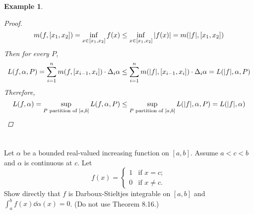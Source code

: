 \documentclass[]{article}
\newtheorem{example}{Example}
\begin{document}
\begin{example}
\begin{enumerate}
\begin{proof}
\[                m(f, [x_1, x_2]) 
                    = \inf_{x \in [x_1, x_2]} f(x) 
                    \leq \inf_{x \in [x_1, x_2]} \abs{f(x)} 
                = m(\abs{f}, [x_1, x_2])
            \] Then for every $P$, \[
                L(f, \alpha, P) 
                    = \sum_{i=1}^{n} m(f, [x_{i-1}, x_i]) \cdot \Delta_i \alpha 
                    \leq \sum_{i=1}^{n} m(\abs{f}, [x_{i-1}, x_i]) \cdot \Delta_i \alpha 
                = L(\abs{f}, \alpha, P)
            \] Therefore, \[
                L(f, \alpha) 
                    = \sup_{P \text{ partition of } [a,b]} L(f, \alpha, P)
                    \leq \sup_{P \text{ partition of } [a,b]} L(\abs{f}, \alpha, P)
                = L(\abs{f}, \alpha)
            \]
        \end{proof}
    \end{enumerate}        
\end{example}

\newpage
\section{}
Let $\alpha$ be a bounded real-valued increasing function on $[a,b]$. 
Assume $a < c < b$ and $\alpha$ is continuous at $c$. 
Let \[
    f(x) = \begin{cases}
        1   &\text{if } x = c;\\
        0   &\text{if } x \neq c.
    \end{cases}
\] Show directly that $f$ is Darboux-Stieltjes integrable on $[a,b]$ and $\int_{a}^{b} f(x) \dd{\alpha(x)} = 0$. 
(Do not use Theorem 8.16.)
\end{document}
